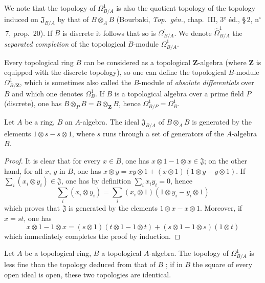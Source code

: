 We note that the topology of $\Omega^1_{B/A}$ is also the quotient topology of the topology induced on $\mathfrak{J}_{B/A}$ by that of $B\otimes_A B$ (Bourbaki, \emph{Top.\ g\'{e}n.}, chap.~III, 3$^\text{e}$ \'{e}d., \S\,2, n$^\circ$\,7, prop.~20).
If $B$ is discrete it follows that so is $\Omega^1_{B/A}$.
We denote $\widehat{\Omega}^1_{B/A}$ the \emph{separated completion} of the topological $B$-module $\Omega^1_{B/A}$.

Every topological ring $B$ can be considered as a topological $\mathbf{Z}$-algebra (where $\mathbf{Z}$ is equipped with the discrete topology), so one can define the topological $B$-module $\Omega^1_{B/\mathbf{Z}}$, which is sometimes also called the $B$-module of \emph{absolute differentials} over $B$ and which one denotes $\Omega^1_B$.
If $B$ is a topological algebra over a prime field $P$ (discrete), one has $B\otimes_P B=B\otimes_{\mathbf{Z}}B$, hence $\Omega^1_{B/P}=\Omega^1_B$.

\begin{lemma}[20.4.4]
\label{0.20.4.4}
Let $A$ be a ring, $B$ an $A$-algebra.
The ideal $\mathfrak{J}_{B/A}$ of $B\otimes_A B$ is generated by the elements $1\otimes s-s\otimes 1$, where $s$ runs through a set of generators of the $A$-algebra $B$.
\end{lemma}

\begin{proof}
It is clear that for every $x\in B$, one has $x\otimes 1-1\otimes x\in\mathfrak{J}$; on the other hand, for all $x$, $y$ in $B$, one has $x\otimes y=xy\otimes 1+(x\otimes 1)(1\otimes y-y\otimes 1)$.
If $\sum_i (x_i\otimes y_i)\in\mathfrak{J}$, one has by definition $\sum_i x_i y_i=0$, hence
\begin{equation}
\tag{20.4.4.1}
  \label{0.20.4.4.1}
  \sum_i (x_i\otimes y_i) = \sum_i (x_i\otimes 1)(1\otimes y_i-y_i\otimes 1)
\end{equation}
which proves that $\mathfrak{J}$ is generated by the elements $1\otimes x-x\otimes 1$.
Moreover, if $x=st$, one has
\begin{equation}
\tag{20.4.4.2}
  \label{0.20.4.4.2}
  x\otimes 1-1\otimes x = (s\otimes 1)(t\otimes 1-1\otimes t)+(s\otimes 1-1\otimes s)(1\otimes t)
\end{equation}
which immediately completes the proof by induction.
\end{proof}

\begin{proposition}[20.4.5]
\label{0.20.4.5}
Let $A$ be a topological ring, $B$ a topological $A$-algebra.
The topology of $\Omega^1_{B/A}$ is less fine than the topology deduced from that of $B$ ; if in $B$ the square of every open ideal is open, these two topologies are identical.
\end{proposition}

